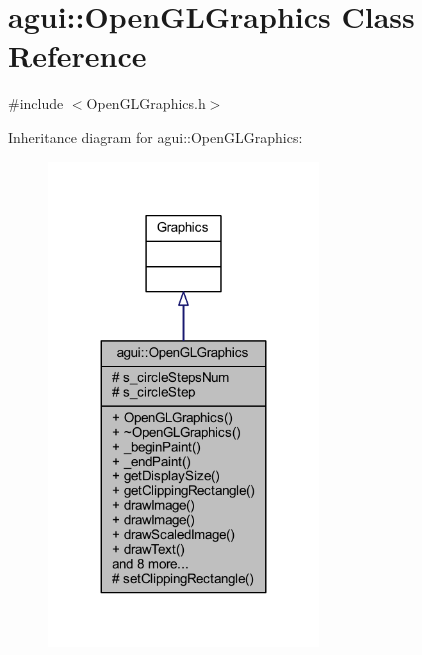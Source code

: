 \hypertarget{classagui_1_1_open_g_l_graphics}{}\section{agui\+:\+:Open\+G\+L\+Graphics Class Reference}
\label{classagui_1_1_open_g_l_graphics}


{\ttfamily \#include $<$Open\+G\+L\+Graphics.\+h$>$}



Inheritance diagram for agui\+:\+:Open\+G\+L\+Graphics\+:
\nopagebreak
\begin{figure}[H]
\begin{center}
\leavevmode
\includegraphics[width=203pt]{classagui_1_1_open_g_l_graphics__inherit__graph}
\end{center}
\end{figure}



